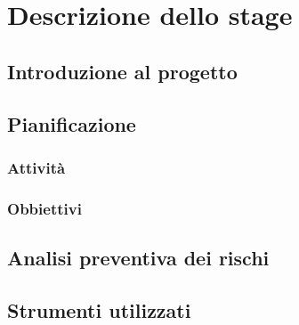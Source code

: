 \chapter{Descrizione dello stage}
\label{chap:descrizione-stage}

\section{Introduzione al progetto}

\section{Pianificazione}
\subsection{Attività}
\subsection{Obbiettivi}

\section{Analisi preventiva dei rischi}

\section{Strumenti utilizzati}

\newpage